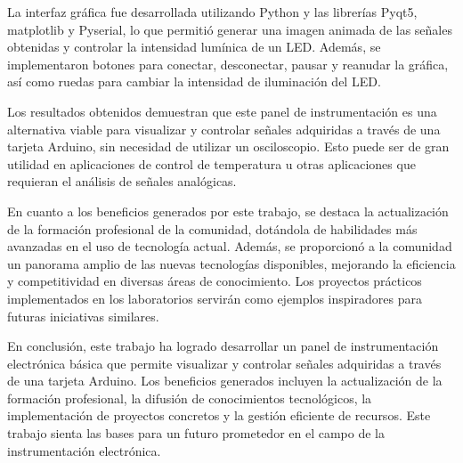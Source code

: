\documentclass[a4paper,12pt]{article}
\begin{document}
        La interfaz gráfica fue desarrollada utilizando Python y las librerías Pyqt5, matplotlib y Pyserial, lo que permitió generar una imagen animada de las señales obtenidas y controlar la intensidad lumínica de un LED. Además, se implementaron botones para conectar, desconectar, pausar y reanudar la gráfica, así como ruedas para cambiar la intensidad de iluminación del LED.
        
        Los resultados obtenidos demuestran que este panel de instrumentación es una alternativa viable para visualizar y controlar señales adquiridas a través de una tarjeta Arduino, sin necesidad de utilizar un osciloscopio. Esto puede ser de gran utilidad en aplicaciones de control de temperatura u otras aplicaciones que requieran el análisis de señales analógicas.
        
        En cuanto a los beneficios generados por este trabajo, se destaca la actualización de la formación profesional de la comunidad, dotándola de habilidades más avanzadas en el uso de tecnología actual. Además, se proporcionó a la comunidad un panorama amplio de las nuevas tecnologías disponibles, mejorando la eficiencia y competitividad en diversas áreas de conocimiento. Los proyectos prácticos implementados en los laboratorios servirán como ejemplos inspiradores para futuras iniciativas similares.
        
        En conclusión, este trabajo ha logrado desarrollar un panel de instrumentación electrónica básica que permite visualizar y controlar señales adquiridas a través de una tarjeta Arduino. Los beneficios generados incluyen la actualización de la formación profesional, la difusión de conocimientos tecnológicos, la implementación de proyectos concretos y la gestión eficiente de recursos. Este trabajo sienta las bases para un futuro prometedor en el campo de la instrumentación electrónica.
    
    \printbibliography 
    
\end{document}
